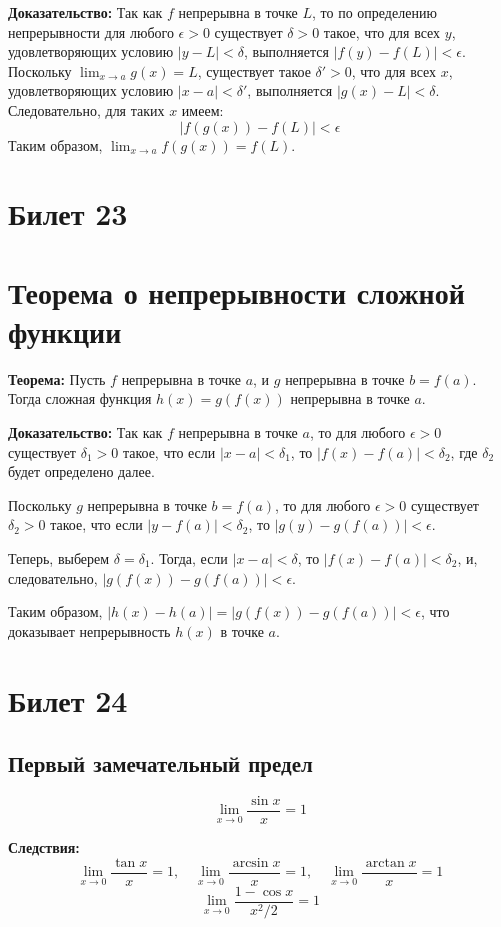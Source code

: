\documentclass{article}
\begin{document}
\textbf{Доказательство:} Так как $f$ непрерывна в точке $L$, то по определению непрерывности для любого $\epsilon > 0$ существует $\delta > 0$ такое, что для всех $y$, удовлетворяющих условию $|y - L| < \delta$, выполняется $|f(y) - f(L)| < \epsilon$. Поскольку $\lim_{x \to a} g(x) = L$, существует такое $\delta' > 0$, что для всех $x$, удовлетворяющих условию $|x - a| < \delta'$, выполняется $|g(x) - L| < \delta$. Следовательно, для таких $x$ имеем:
\[
|f(g(x)) - f(L)| < \epsilon
\]
Таким образом, $\lim_{x \to a} f(g(x)) = f(L)$.

\section{Билет 23}

\section*{Теорема о непрерывности сложной функции}

\textbf{Теорема:} Пусть $f$ непрерывна в точке $a$, и $g$ непрерывна в точке $b = f(a)$. Тогда сложная функция $h(x) = g(f(x))$ непрерывна в точке $a$.

\textbf{Доказательство:} Так как $f$ непрерывна в точке $a$, то для любого $\epsilon > 0$ существует $\delta_1 > 0$ такое, что если $|x - a| < \delta_1$, то $|f(x) - f(a)| < \delta_2$, где $\delta_2$ будет определено далее.

Поскольку $g$ непрерывна в точке $b = f(a)$, то для любого $\epsilon > 0$ существует $\delta_2 > 0$ такое, что если $|y - f(a)| < \delta_2$, то $|g(y) - g(f(a))| < \epsilon$.

Теперь, выберем $\delta = \delta_1$. Тогда, если $|x - a| < \delta$, то $|f(x) - f(a)| < \delta_2$, и, следовательно, $|g(f(x)) - g(f(a))| < \epsilon$.

Таким образом, $|h(x) - h(a)| = |g(f(x)) - g(f(a))| < \epsilon$, что доказывает непрерывность $h(x)$ в точке $a$.


\section{Билет 24}
\subsection*{Первый замечательный предел}
\[
\lim_{x \to 0} \frac{\sin x}{x} = 1
\]

\textbf{Следствия:}
\[
\lim_{x \to 0} \frac{\tan x}{x} = 1, \quad \lim_{x \to 0} \frac{\arcsin x}{x} = 1, \quad \lim_{x \to 0} \frac{\arctan x}{x} = 1
\]
\[
\lim_{x \to 0} \frac{1 - \cos x}{x^2/2} = 1
\]
\end{document}
